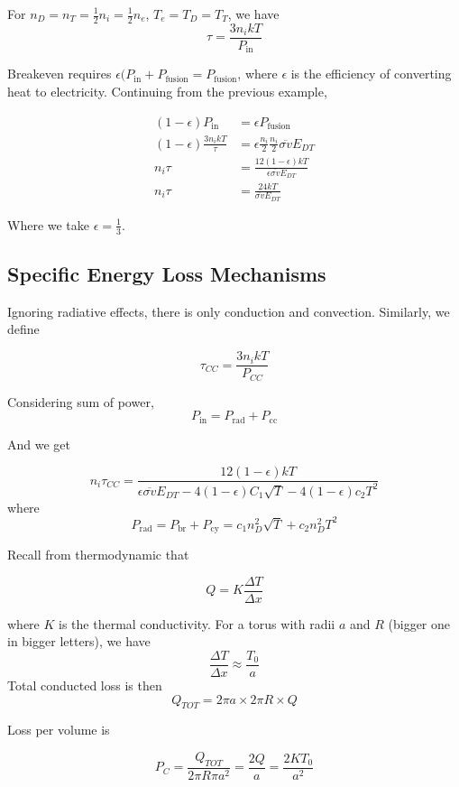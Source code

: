 \documentclass[12pt]{article}
\begin{document}
\begin{ex}
    For $n_D = n_T = \frac{1}{2} n_i = \frac{1}{2} n_e$, $T_e = T_D = T_T$, we have
    $$\tau = \frac{3n_ikT}{P_{\text{in}}}$$
\end{ex}

Breakeven requires $\epsilon(P_{\text{in}} + P_{\text{fusion}} = P_{\text{fusion}}$, where $\epsilon$ is the efficiency of converting heat to electricity. Continuing from the previous example,

\begin{align*}
    (1-\epsilon)P_{\text{in}} &= \epsilon P_{\text{fusion}} \\
    (1-\epsilon) \frac{3n_ikT}{\tau} &= \epsilon \frac{n_i}{2} \frac{n_i}{2} \overline{\sigma v} E_{DT} \\
    n_i\tau &= \frac{12(1-\epsilon)kT}{\epsilon\overline{\sigma v}E_{DT}} \\
    n_i\tau &= \frac{24kT}{\overline{\sigma v}E_{DT}}
\end{align*}

Where we take $\epsilon = \frac{1}{3}$.

\subsection{Specific Energy Loss Mechanisms}

Ignoring radiative effects, there is only conduction and convection. Similarly, we define

$$\tau_{CC} = \frac{3n_ikT}{P_{CC}}$$

Considering sum of power,
$$P_{\text{in}} = P_{\text{rad}} + P_{\text{cc}}$$

And we get

$$n_i\tau_{CC} = \frac{12(1-\epsilon)kT}{\epsilon\overline{\sigma v}E_{DT} - 4(1-\epsilon)C_1\sqrt{T} - 4(1-\epsilon)c_2T^2}$$
where
$$P_{\text{rad}} = P_{\text{br}} + P_{\text{cy}} = c_1n_D^2\sqrt{T} + c_2n_D^2T^2$$

Recall from thermodynamic that

$$Q = K\frac{\Delta T}{\Delta x}$$

where $K$ is the thermal conductivity. For a torus with radii $a$ and $R$ (bigger one in bigger letters), we have
$$\frac{\Delta T}{\Delta x} \approx \frac{T_0}{a}$$
Total conducted loss is then
$$Q_{TOT} = 2\pi a \times 2\pi R \times Q$$

Loss per volume is

$$P_C = \frac{Q_{TOT}}{2\pi R\pi a^2} = \frac{2Q}{a} = \frac{2KT_0}{a^2}$$
\end{document}
